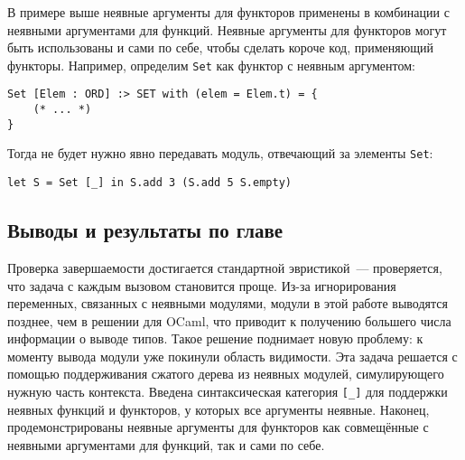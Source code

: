 \documentclass[../diploma.tex]{subfiles}
\begin{document}
В примере выше неявные аргументы для функторов применены в комбинации с неявными аргументами для функций. Неявные аргументы для функторов могут быть использованы и сами по себе, чтобы сделать короче код, применяющий функторы. Например, определим \texttt{Set} как функтор с неявным аргументом:

\begin{verbatim}
Set [Elem : ORD] :> SET with (elem = Elem.t) = {
    (* ... *)
}
\end{verbatim}

Тогда не будет нужно явно передавать модуль, отвечающий за элементы \texttt{Set}:

\begin{verbatim}
let S = Set [_] in S.add 3 (S.add 5 S.empty)
\end{verbatim}

\subsection{Выводы и результаты по главе}

Проверка завершаемости достигается стандартной эвристикой~--- проверяется, что задача с каждым вызовом становится проще. Из-за игнорирования переменных, связанных с неявными модулями, модули в этой работе выводятся позднее, чем в решении для OCaml, что приводит к получению большего числа информации о выводе типов. Такое решение поднимает новую проблему: к моменту вывода модули уже покинули область видимости. Эта задача решается с помощью поддерживания сжатого дерева из неявных модулей, симулирующего нужную часть контекста. Введена синтаксическая категория \texttt{[_]} для поддержки неявных функций и функторов, у которых все аргументы неявные. Наконец, продемонстрированы неявные аргументы для функторов как совмещённые с неявными аргументами для функций, так и сами по себе.
\end{document}
